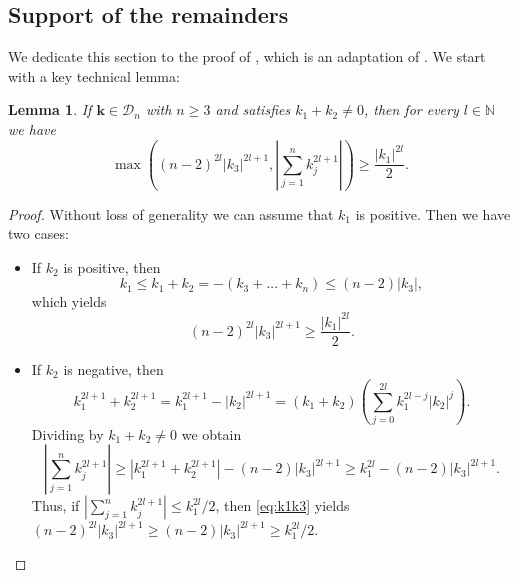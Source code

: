 \documentclass[a4paper,10pt,reqno]{article}
\theoremstyle{definition}
\theoremstyle{plain}
\theoremstyle{plain}
\theoremstyle{definition}
\theoremstyle{plain}
\newtheorem{cor}[definition]{Corollary}
\theoremstyle{plain}
\theoremstyle{plain}
\newtheorem{lemma}[definition]{Lemma}
\theoremstyle{definition}
\theoremstyle{definition}
\def \N{\mathbb N}
\begin{document}

\subsection{Support of the remainders}
\label{app: resti}

We dedicate this section to the proof of , which is an adaptation of \cite[Lemma 3.7 and Corollary 3.8]{bernier}. We start with a key technical lemma:

\begin{lemma} \label{lemma algebrico bernier}
If $\bm{k} \in \mathcal{D}_n$ with $n \ge 3$ and satisfies $k_1+k_2 \neq 0$, then for every $l \in \N$ we have
\[
\max \left ( (n-2)^{2l} |k_3|^{2l+1} , \left \lvert \sum_{j=1}^n k_j^{2l+1} \right \rvert \right ) \ge \frac{|k_1|^{2l}}{2}.
\]
\end{lemma}
\begin{proof}
Without loss of generality we can assume that $k_1$ is positive. 
Then we have two cases:
\begin{itemize}
\item If $k_2$ is positive, then
\[
k_1 \le k_1+k_2 = -(k_3+\ldots+k_n) \le (n-2)|k_3|,
\]
which yields
\[
(n-2)^{2l} |k_3|^{2l+1} \ge \frac{|k_1|^{2l}}{2}.
\]
\item If $k_2$ is negative, then 
\[
k_1^{2l+1} + k_2^{2l+1} = k_1^{2l+1} - |k_2|^{2l+1} = (k_1+k_2) \left ( \sum_{j=0}^{2l} k_1^{2l-j}|k_2|^j \right ).
\]
Dividing by $k_1+k_2 \neq 0$ we obtain
\begin{equation}\label{eq:k1k3}
\left \lvert \sum_{j=1}^n k_j^{2l+1} \right \rvert \ge \left \lvert k_1^{2l+1} + k_2^{2l+1} \right \rvert - (n-2)|k_3|^{2l+1} \ge k_1^{2l} - (n-2) |k_3|^{2l+1}.
\end{equation}
Thus, if $\left \lvert \sum_{j=1}^n k_j^{2l+1} \right \rvert \le k_1^{2l}/2$, then \eqref{eq:k1k3} yields $(n-2)^{2l}|k_3|^{2l+1} \ge (n-2)|k_3|^{2l+1} \ge k_1^{2l}/2$.
\end{itemize}
\end{proof}
\end{document}
